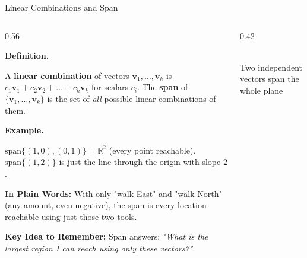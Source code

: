 \documentclass[9pt,aspectratio=169]{beamer}
\newcommand{\keyidea}[1]{%
\par\medskip\noindent\textbf{Key Idea to Remember:} #1\par\medskip}
\newcommand{\childex}[1]{%
\par\medskip\noindent\textbf{In Plain Words:} #1\par\medskip}
\begin{document}
\begin{frame}{Linear Combinations and Span}
\footnotesize
\begin{columns}[T]
\begin{column}{0.56\textwidth}
\par\noindent\textbf{Definition.}\par
A \textbf{linear combination} of vectors $\mathbf{v}_1,\dots,\mathbf{v}_k$ is
$c_1\mathbf{v}_1 + c_2\mathbf{v}_2 + \dots + c_k\mathbf{v}_k$ for scalars $c_i$.
The \textbf{span} of $\{\mathbf{v}_1,\dots,\mathbf{v}_k\}$ is the set of \emph{all}
possible linear combinations of them.
\medskip

\par\noindent\textbf{Example.}\par
$\text{span}\{(1,0),(0,1)\} = \mathbb{R}^2$ (every point reachable).
$\text{span}\{(1,2)\}$ is just the line through the origin with slope $2$.
\medskip

\childex{With only "walk East" and "walk North" (any amount, even negative), the span is
every location reachable using just those two tools.}

\keyidea{Span answers: \emph{"What is the largest region I can reach using only these
vectors?"}}
\end{column}
\begin{column}{0.42\textwidth}
\centering
{}
\\[0.3em]{\scriptsize Two independent vectors span the whole plane}
\end{column}
\end{columns}
\end{frame}
\end{document}
